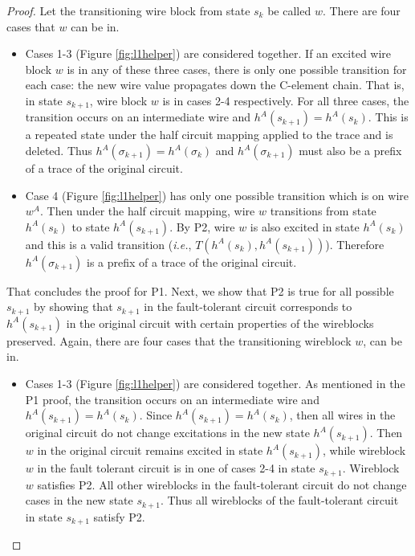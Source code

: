 \documentclass[12pt]{report}
\begin{document}
\begin{proof}
Let the transitioning wire block from state $s_k$ be called $w$.  There are four cases that $w$ can be in.  %
\begin{itemize}  
\item Cases 1-3 (Figure \ref{fig:l1helper}) are considered together.  
If an excited wire block $w$ is in any of these three cases, there is only one possible transition for each case: the new wire value propagates down the C-element chain.  That is, in state $s_{k+1}$, wire block $w$ is in cases 2-4 respectively.  For all three cases, the transition occurs on an intermediate wire and $h^A(s_{k+1})=h^A(s_{k})$.  This is a repeated state under the half circuit mapping applied to the trace and is deleted.  Thus $h^{A}(\sigma_{k+1})=h^{A}(\sigma_k)$ and $h^{A}(\sigma_{k+1})$ must also be a prefix of a trace of the original circuit. 
\item Case 4 (Figure \ref{fig:l1helper}) has only one possible transition which is on wire $w^A$.  Then under the half circuit mapping, wire $w$ transitions from state $h^A(s_k)$ to state $h^A(s_{k+1})$.  By P2, wire $w$ is also excited in state $h^A(s_k)$ and this is a valid transition ({\em i.e.}, $T(h^A(s_k), h^A(s_{k+1}))$).  Therefore $h^{A}(\sigma_{k+1})$ is a prefix of a trace of the original circuit. 
\end{itemize}

That concludes the proof for P1.  Next, we show that P2 is true for all possible $s_{k+1}$ by showing that $s_{k+1}$ in the fault-tolerant circuit corresponds to $h^A(s_{k+1})$ in the original circuit with certain properties of the wireblocks preserved.  Again, there are four cases that the transitioning wireblock $w$, can be in.  

\begin{itemize}
\item Cases 1-3 (Figure \ref{fig:l1helper}) are considered together.  As mentioned in the P1 proof, the transition occurs on an intermediate wire and $h^A(s_{k+1})=h^A(s_{k})$.  Since $h^A(s_{k+1})=h^A(s_{k})$, then all wires in the original circuit do not change excitations in the new state $h^A(s_{k+1})$.  Then $w$ in the original circuit remains excited in state $h^A(s_{k+1})$, while wireblock $w$ in the fault tolerant circuit is in one of cases 2-4 in state $s_{k+1}$.  Wireblock $w$ satisfies P2.  All other wireblocks in the fault-tolerant circuit do not change cases in the new state $s_{k+1}$.  
Thus all wireblocks of the fault-tolerant circuit in state $s_{k+1}$ satisfy P2.     


\end{itemize}
\end{proof}
\end{document}
